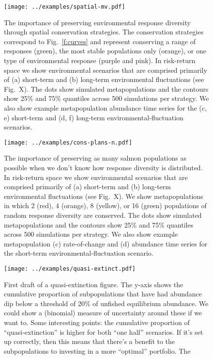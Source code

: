 \begin{figure}[htbp]
\centering
\texttt{[image: ../examples/spatial-mv.pdf]}
\caption{The importance of preserving environmental response diversity through 
spatial conservation strategies. The conservation strategies correspond to 
Fig.~\ref{f:curves} and represent conserving a range of responses (green), the 
most stable populations only (orange), or one type of environmental response 
(purple and pink).  In risk-return space we show environmental scenarios that 
are comprised primarily of (a) short-term and (b) long-term environmental 
fluctuations (see Fig.~X). The dots show simulated metapopulations and the 
contours show 25\% and 75\% quantiles across 500 simulations per strategy. We 
also show example metapopulation abundance time series for the (c, e) 
short-term and (d, f) long-term  environmental-fluctuation scenarios.}
\label{f:sp-mv}
\end{figure}

\clearpage

\begin{figure}[htbp]
\centering
\texttt{[image: ../examples/cons-plans-n.pdf]}
\caption{The importance of preserving as many salmon populations as possible 
when we don't know how response diversity is distributed. In risk-return space 
we show environmental scenarios that are comprised primarily of (a) short-term 
and (b) long-term environmental fluctuations (see Fig.~X). We show 
metapopulations in which 2 (red), 4 (orange), 8 (yellow), or 16 (green) 
populations of random response diversity are conserved. The dots show simulated 
metapopulations and the contours show 25\% and 75\% quantiles across 500 
simulations per strategy. We also show example metapopulation (c) 
rate-of-change and (d) abundance time series for the short-term 
environmental-fluctuation scenario.}
\label{f:n-mv}
\end{figure}

\clearpage

\begin{figure}[htbp]
\centering
\texttt{[image: ../examples/quasi-extinct.pdf]}
\caption{First draft of a quasi-extinction figure. The y-axis shows the 
cumulative proportion of subpopulations that have had abundance dip below a 
threshold of 20\% of unfished equilibrium abundance. We could show a (binomial) 
measure of uncertainty around these if we want to. Some interesting points: the 
cumulative proportion of ``quasi-extinction'' is higher for both ``one half'' 
scenarios. If it's set up correctly, then this means that there's a benefit to 
the subpopulations to investing in a more ``optimal'' portfolio. The }
\label{f:n-mv}
\end{figure}
